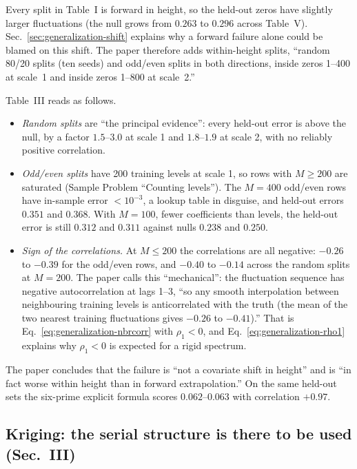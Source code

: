 Every split in Table~I is forward in height, so the held-out zeros have slightly larger fluctuations (the null grows from $0.263$ to $0.296$ across Table~V). Sec.~\ref{sec:generalization-shift} explains why a forward failure alone could be blamed on this shift. The paper therefore adds within-height splits, ``random 80/20 splits (ten seeds) and odd/even splits in both directions, inside zeros 1--400 at scale~1 and inside zeros 1--800 at scale~2.''

Table~III reads as follows.
\begin{itemize}
\item \emph{Random splits} are ``the principal evidence'': every held-out error is above the null, by a factor $1.5$--$3.0$ at scale 1 and $1.8$--$1.9$ at scale 2, with no reliably positive correlation.
\item \emph{Odd/even splits} have 200 training levels at scale 1, so rows with $M\ge200$ are saturated (Sample Problem ``Counting levels''). The $M=400$ odd/even rows have in-sample error $<10^{-3}$, a lookup table in disguise, and held-out errors $0.351$ and $0.368$. With $M=100$, fewer coefficients than levels, the held-out error is still $0.312$ and $0.311$ against nulls $0.238$ and $0.250$.
\item \emph{Sign of the correlations.} At $M\le200$ the correlations are all negative: $-0.26$ to $-0.39$ for the odd/even rows, and $-0.40$ to $-0.14$ across the random splits at $M=200$. The paper calls this ``mechanical'': the fluctuation sequence has negative autocorrelation at lags 1--3, ``so any smooth interpolation between neighbouring training levels is anticorrelated with the truth (the mean of the two nearest training fluctuations gives $-0.26$ to $-0.41$).'' That is Eq.~\eqref{eq:generalization-nbrcorr} with $\rho_1<0$, and Eq.~\eqref{eq:generalization-rho1} explains why $\rho_1<0$ is expected for a rigid spectrum.
\end{itemize}
The paper concludes that the failure is ``not a covariate shift in height'' and is ``in fact worse within height than in forward extrapolation.'' On the same held-out sets the six-prime explicit formula scores $0.062$--$0.063$ with correlation $+0.97$.

\subsection{Kriging: the serial structure is there to be used (Sec.~III)}

